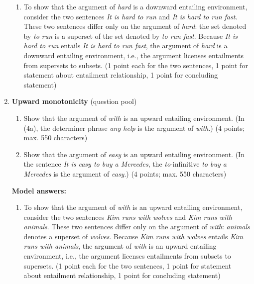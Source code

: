 \documentclass[a4,11pt]{article}
\begin{document}
\begin{enumerate}[leftmargin = 12pt]
\begin{enumerate}[noitemsep]
\item To show that the argument of \textit{hard} is a downward entailing environment, consider the two sentences {\em It is hard to run} and {\em It is hard to run fast}. These two sentences differ only on the argument of {\em hard}: the set denoted by {\em to run} is a superset of the set denoted by {\em to run fast}. Because {\em It is hard to run} entails {\em It is hard to run fast}, the argument of {\em hard} is a downward entailing environment, i.e., the argument licenses entailments from supersets to subsets. (1 point each for the two sentences, 1 point for statement about entailment relationship, 1 point for concluding statement)

\end{enumerate}

\item {\bf Upward monotonicity} (question pool)

\begin{enumerate}[noitemsep]

\item Show that the argument of \textit{with} is an upward entailing environment. (In (4a), the determiner phrase \textit{any help} is the argument of \textit{with}.) (4 points; max. 550 characters)

\item Show that the argument of \textit{easy} is an upward entailing environment. (In the sentence \textit{It is easy to buy a Mercedes}, the \textit{to}-infinitive \textit{to buy a Mercedes} is the argument of \textit{easy}.) (4 points; max. 550 characters)

\end{enumerate}

{\bf Model answers:} 

\begin{enumerate}[noitemsep]

\item To show that the argument of \textit{with} is an upward entailing environment, consider the two sentences \textit{Kim runs with wolves} and \textit{Kim runs with animals}. These two sentences differ only on the argument of {\em with}: {\em animals} denotes a superset of {\em wolves}. Because \textit{Kim runs with wolves} entails \textit{Kim runs with animals}, the argument of \textit{with} is an upward entailing environment, i.e., the argument licenses entailments from subsets to supersets. (1 point each for the two sentences, 1 point for statement about entailment relationship, 1 point for concluding statement)


\end{enumerate}
\end{enumerate}
\end{document}
